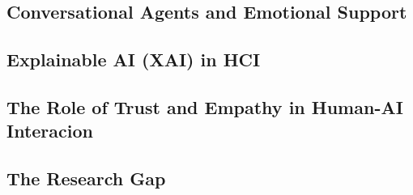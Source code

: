 \subsection{Conversational Agents and Emotional Support}

\subsection{Explainable AI (XAI) in HCI}

\subsection{The Role of Trust and Empathy in Human-AI Interacion}

\subsection{The Research Gap}